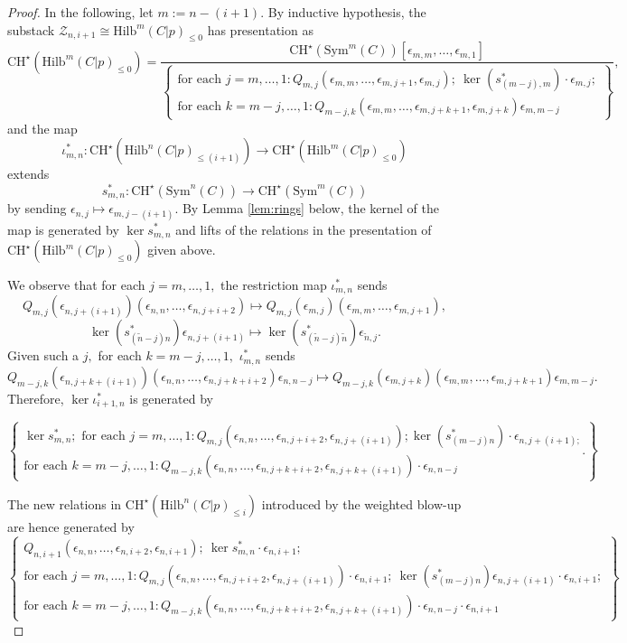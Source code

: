 \documentclass[10.5pt]{amsart}
\theoremstyle{definition}
\theoremstyle{definition}
\theoremstyle{definition}
\theoremstyle{definition}
\newcommand{\Hilb}{\mathrm{Hilb}}
\newcommand{\CHs}{\mathrm{CH}^\star}
\begin{document}
\begin{proof}
  In the following, let $m:=n-(i+1).$ By inductive hypothesis, the substack $\mathcal{Z}_{n,i+1}\cong \Hilb^{m}(C|p)_{\leq 0}$ has presentation as $$\CHs(\Hilb^m(C|p)_{\le 0})=\frac{\mathrm{CH}^\star(\mathrm{Sym}^{m}(C))[\epsilon_{m,m},\dots, \epsilon_{m,1}]}{\left\{\begin{array}{c}
   \text{for each } j = m, \dots, 1: Q_{m,j}(\epsilon_{m,m},\dots,\epsilon_{m,j+1}, \epsilon_{m,j}); \  \ker(s_{(m-j),m}^*) \cdot \epsilon_{m,j};\\\text{for each } k = m-j, \dots, 1: Q_{m-j,k}(\epsilon_{m,m},\dots, \epsilon_{m,j+k+1}, \epsilon_{m,j+k})\epsilon_{m,m-j}
  \end{array}\right\}},$$ and the map $$\iota_{m,n}^*: \mathrm{CH}^\star(\Hilb^n(C|p)_{\leq (i+1)})\to \mathrm{CH}^\star(\Hilb^{m}(C|p)_{\leq 0})$$ extends $$s_{m,n}^*: \mathrm{CH}^\star(\mathrm{Sym}^n(C))\to \mathrm{CH}^\star(\mathrm{Sym}^{m}(C))$$ by sending $\epsilon_{n,j}\mapsto \epsilon_{m, j-(i+1)}.$ By Lemma \ref{lem:rings} below, the kernel of the map is generated by $\ker s_{m,n}^*$ and lifts of the relations in the presentation of $\mathrm{CH}^\star(\Hilb^{m}(C|p)_{\leq 0})$ given above.
  
  We observe that for each $j= m, \dots, 1,$ the restriction map $\iota_{m,n}^*$ sends $$Q_{m, j}(\epsilon_{n, j+(i+1)})(\epsilon_{n,n},\dots, \epsilon_{n, j+i+2})\mapsto Q_{m,j}(\epsilon_{m,j})(\epsilon_{m,m},\dots,\epsilon_{m,j+1}),$$ {$$\ker(s_{(\tilde{n}-j)n}^*)\epsilon_{n,j+(i+1)}\mapsto \ker(s_{(\tilde{n}-j)\tilde{n}}^*)\epsilon_{\tilde{n},j}.$$} 
  Given such a $j,$ for each $k = m-j,\dots, 1,$ $\iota_{m,n}^*$ sends $$Q_{m-j, k}(\epsilon_{n, j+k+(i+1)})(\epsilon_{n,n},\dots, \epsilon_{n, j+k+i+2})\epsilon_{n,n-j}\mapsto Q_{m-j,k}(\epsilon_{m,j+k})(\epsilon_{m,m},\dots, \epsilon_{m,j+k+1})\epsilon_{m,m-j}.$$ Therefore, $\ker \iota_{i+1,n}^*$ is generated by
  
$$\left\{\begin{array}{c}
    \ker s_{m,n}^*;  \text{ for each } j= m, \dots, 1:  Q_{m, j}(\epsilon_{n,n},\dots, \epsilon_{n, j+i+2}, \epsilon_{n, j+(i+1)});  \ker(s_{(m-j)n}^*)\cdot \epsilon_{n,j+(i+1);}\\
    \text{for each }k = m-j,\dots, 1:  Q_{m-j, k}(\epsilon_{n,n},\dots, \epsilon_{n, j+k+i+2}, \epsilon_{n, j+k+(i+1)}) \cdot \epsilon_{n,n-j}
  \end{array} \right\}.$$
  
  The new relations in $\mathrm{CH}^\star(\Hilb^n(C|p)_{\leq i})$ introduced by the weighted blow-up are hence generated by 
  $$\left\{\begin{array}{c}
    Q_{n,i+1}(\epsilon_{n,n},\dots, \epsilon_{n,i+2}, \epsilon_{n,i+1}); \ \ker s_{m,n}^* \cdot \epsilon_{n,i+1};
    \\
     \text{for each }j=m, \dots, 1:  Q_{m, j}(\epsilon_{n,n},\dots, \epsilon_{n, j+i+2}, \epsilon_{n, j+(i+1)})\cdot\epsilon_{n,i+1}; \  \ker(s_{(m-j)n}^*)\epsilon_{n,j+(i+1)}\cdot \epsilon_{n,i+1};\\
    \text{for each }k = m-j,\dots, 1:  Q_{m-j, k}(\epsilon_{n,n},\dots, \epsilon_{n, j+k+i+2}, \epsilon_{n, j+k+(i+1)})\cdot \epsilon_{n,n-j} \cdot \epsilon_{n,i+1}
  \end{array} \right\}$$
  

\end{proof}
\end{document}
